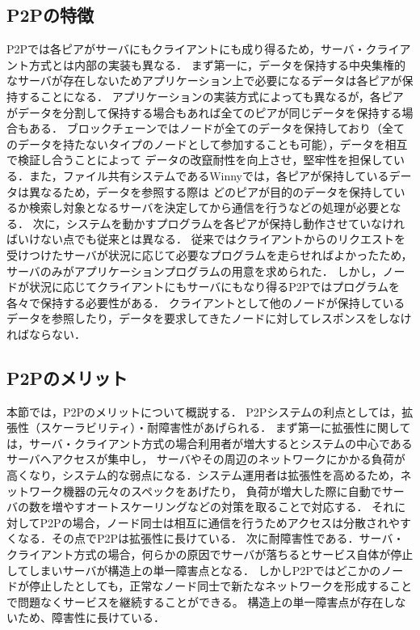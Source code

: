 \subsection{P2Pの特徴}

P2Pでは各ピアがサーバにもクライアントにも成り得るため，サーバ・クライアント方式とは内部の実装も異なる．
まず第一に，データを保持する中央集権的なサーバが存在しないためアプリケーション上で必要になるデータは各ピアが保持することになる．
アプリケーションの実装方式によっても異なるが，各ピアがデータを分割して保持する場合もあれば全てのピアが同じデータを保持する場合もある．
ブロックチェーンではノードが全てのデータを保持しており（全てのデータを持たないタイプのノードとして参加することも可能），データを相互で検証し合うことによって
データの改竄耐性を向上させ，堅牢性を担保している．また，ファイル共有システムであるWinnyでは，各ピアが保持しているデータは異なるため，データを参照する際は
どのピアが目的のデータを保持しているか検索し対象となるサーバを決定してから通信を行うなどの処理が必要となる．
次に，システムを動かすプログラムを各ピアが保持し動作させていなければいけない点でも従来とは異なる．
従来ではクライアントからのリクエストを受けつけたサーバが状況に応じて必要なプログラムを走らせればよかったため，サーバのみがアプリケーションプログラムの用意を求められた．
しかし，ノードが状況に応じてクライアントにもサーバにもなり得るP2Pではプログラムを各々で保持する必要性がある．
クライアントとして他のノードが保持しているデータを参照したり，データを要求してきたノードに対してレスポンスをしなければならない．

\subsection{P2Pのメリット}

本節では，P2Pのメリットについて概説する．
P2Pシステムの利点としては，拡張性（スケーラビリティ）・耐障害性があげられる．
まず第一に拡張性に関しては，サーバ・クライアント方式の場合利用者が増大するとシステムの中心であるサーバへアクセスが集中し，
サーバやその周辺のネットワークにかかる負荷が高くなり，システム的な弱点になる．システム運用者は拡張性を高めるため，ネットワーク機器の元々のスペックをあげたり，
負荷が増大した際に自動でサーバの数を増やすオートスケーリングなどの対策を取ることで対応する．
それに対してP2Pの場合，ノード同士は相互に通信を行うためアクセスは分散されやすくなる．その点でP2Pは拡張性に長けている．
次に耐障害性である．サーバ・クライアント方式の場合，何らかの原因でサーバが落ちるとサービス自体が停止してしまいサーバが構造上の単一障害点となる．
しかしP2Pではどこかのノードが停止したとしても，正常なノード同士で新たなネットワークを形成することで問題なくサービスを継続することができる。
構造上の単一障害点が存在しないため、障害性に長けている．

